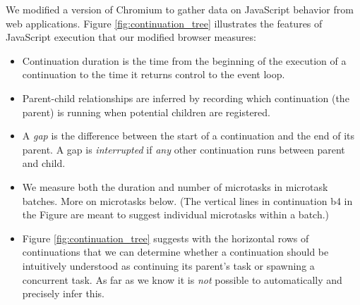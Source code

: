 \documentclass[acmsmall,anonymous,review]{acmart}\settopmatter{printfolios=true,printccs=false,printacmref=false}
\begin{document}
We modified a version of Chromium to gather data on JavaScript behavior from web applications.
Figure \ref{fig:continuation_tree} illustrates the features of JavaScript execution that our modified browser measures:

\begin{itemize}
\item Continuation duration is the time from the beginning of the execution of a continuation to the time it returns control to the event loop.
\item Parent-child relationships are inferred by recording which continuation (the parent) is running when potential children are registered.
\item A \emph{gap} is the difference between the start of a continuation and the end of its parent.
  A gap is \emph{interrupted} if \emph{any} other continuation runs between parent and child.
\item We measure both the duration and number of microtasks in microtask batches.
  More on microtasks below.
  (The vertical lines in continuation b4 in the Figure are meant to suggest individual microtasks within a batch.)
\item Figure \ref{fig:continuation_tree} suggests with the horizontal rows of continuations that we can determine whether a continuation should be intuitively understood as continuing its parent's task or spawning a concurrent task.
  As far as we know it is \emph{not} possible to automatically and precisely infer this.
\end{itemize}
\end{document}
